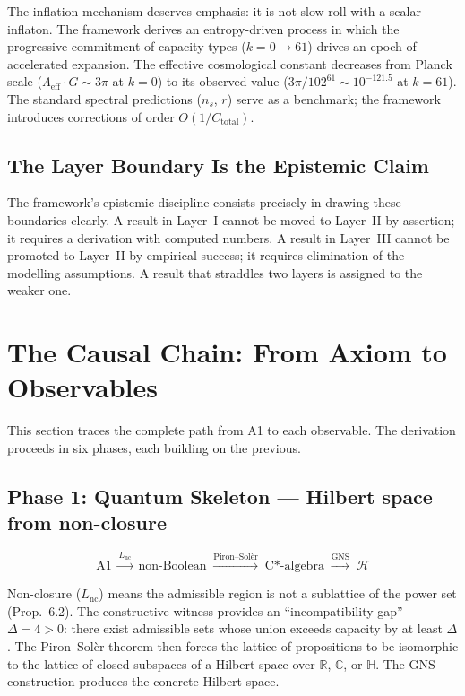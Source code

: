 \documentclass[11pt]{article}
\begin{document}
The inflation mechanism deserves emphasis: it is not slow-roll with a scalar inflaton.  The framework derives an entropy-driven process in which the progressive commitment of capacity types ($k = 0 \to 61$) drives an epoch of accelerated expansion.  The effective cosmological constant decreases from Planck scale ($\Lambda_{\mathrm{eff}}\cdot G \sim 3\pi$ at $k=0$) to its observed value ($3\pi/102^{61} \sim 10^{-121.5}$ at $k=61$).  The standard spectral predictions ($n_s$, $r$) serve as a benchmark; the framework introduces corrections of order $O(1/C_{\mathrm{total}})$.


\subsection{The Layer Boundary Is the Epistemic Claim}

The framework's epistemic discipline consists precisely in drawing these boundaries clearly.  A result in Layer~I cannot be moved to Layer~II by assertion; it requires a derivation with computed numbers.  A result in Layer~III cannot be promoted to Layer~II by empirical success; it requires elimination of the modelling assumptions.  A result that straddles two layers is assigned to the weaker one.


\section{The Causal Chain: From Axiom to Observables}

This section traces the complete path from A1 to each observable.  The derivation proceeds in six phases, each building on the previous.

\subsection{Phase 1: Quantum Skeleton --- Hilbert space from non-closure}

\begin{equation}
\text{A1} \;\xrightarrow{L_{\mathrm{nc}}}\; \text{non-Boolean} \;\xrightarrow{\text{Piron--Sol\`er}}\; \text{C*-algebra} \;\xrightarrow{\text{GNS}}\; \mathcal{H}
\end{equation}

Non-closure ($L_{\mathrm{nc}}$) means the admissible region is not a sublattice of the power set (Prop.~6.2).  The constructive witness provides an ``incompatibility gap'' $\Delta = 4 > 0$: there exist admissible sets whose union exceeds capacity by at least $\Delta$.  The Piron--Sol\`er theorem then forces the lattice of propositions to be isomorphic to the lattice of closed subspaces of a Hilbert space over $\mathbb{R}$, $\mathbb{C}$, or $\mathbb{H}$.  The GNS construction produces the concrete Hilbert space.
\end{document}
